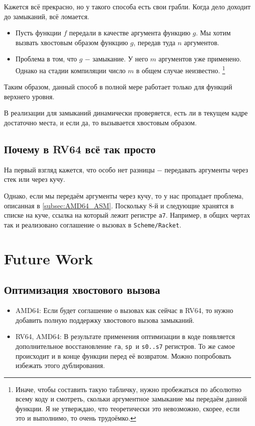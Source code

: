 Кажется всё прекрасно, но у такого способа есть свои грабли.
Когда дело доходит до замыканий, всё ломается.

\begin{itemize}
	\item Пусть функции $f$ передали в качестве аргумента функцию $g$.
	Мы хотим вызвать хвостовым образом функцию $g$, передав туда $n$ аргументов.
	\item Проблема в том, что $g$ $-$ замыкание. У него $m$ аргументов уже применено.
	Однако на стадии компиляции число $m$ в общем случае неизвестно. \footnote{Иначе, чтобы составить такую табличку, нужно пробежаться по абсолютно всему коду и смотреть, скольки аргументное замыкание мы передаём данной функции. Я не утверждаю, что теоретически это невозможно, скорее, если это и выполнимо, то очень трудоёмко.}
\end{itemize}

Таким образом, данный способ в полной мере работает только для функций верхнего уровня.

В реализации для замыканий динамически проверяется, есть ли в текущем кадре достаточно места, и если да, то вызывается хвостовым образом.

\subsection{Почему в RV64 всё так просто}
На первый взгляд кажется, что особо нет разницы $-$ передавать аргументы через стек или через кучу.

Однако, если мы передаём аргументы через кучу, то у нас пропадает проблема, описанная в \ref{subsec:AMD64_ASM}. Поскольку 8-й и следующие хранятся в списке на куче, ссылка на который лежит регистре \texttt{a7}. Например, в общих чертах так и реализовано соглашение о вызовах в \texttt{Scheme/Racket}.
\section{Future Work}
\subsection{Оптимизация хвостового вызова}
\begin{itemize}

\item AMD64: Если будет соглашение о вызовах как сейчас в RV64, то нужно добавить полную поддержку хвостового вызова замыканий.
\item RV64, AMD64: В результате применения оптимизации в коде появляется дополнительное восстановление \texttt{ra}, \texttt{sp }и \texttt{s0..s7} регистров. То же самое происходит и в конце функции перед её возвратом. Можно попробовать избежать этого дублирования.
\end{itemize}

